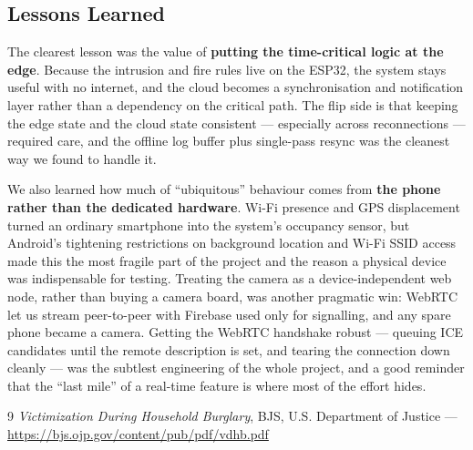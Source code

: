 \documentclass[10pt,twocolumn]{article}
\begin{document}
\subsection{Lessons Learned}
The clearest lesson was the value of \textbf{putting the time-critical logic at the edge}. Because the intrusion and fire rules live on the ESP32, the system stays useful with no internet, and the cloud becomes a synchronisation and notification layer rather than a dependency on the critical path. The flip side is that keeping the edge state and the cloud state consistent --- especially across reconnections --- required care, and the offline log buffer plus single-pass resync was the cleanest way we found to handle it.

We also learned how much of ``ubiquitous'' behaviour comes from \textbf{the phone rather than the dedicated hardware}. Wi-Fi presence and GPS displacement turned an ordinary smartphone into the system's occupancy sensor, but Android's tightening restrictions on background location and Wi-Fi SSID access made this the most fragile part of the project and the reason a physical device was indispensable for testing. Treating the camera as a device-independent web node, rather than buying a camera board, was another pragmatic win: WebRTC let us stream peer-to-peer with Firebase used only for signalling, and any spare phone became a camera. Getting the WebRTC handshake robust --- queuing ICE candidates until the remote description is set, and tearing the connection down cleanly --- was the subtlest engineering of the whole project, and a good reminder that the ``last mile'' of a real-time feature is where most of the effort hides.

\begin{thebibliography}{9}
 \emph{Victimization During Household Burglary}, BJS, U.S. Department of Justice --- \url{https://bjs.ojp.gov/content/pub/pdf/vdhb.pdf}
\end{thebibliography}
\end{document}
